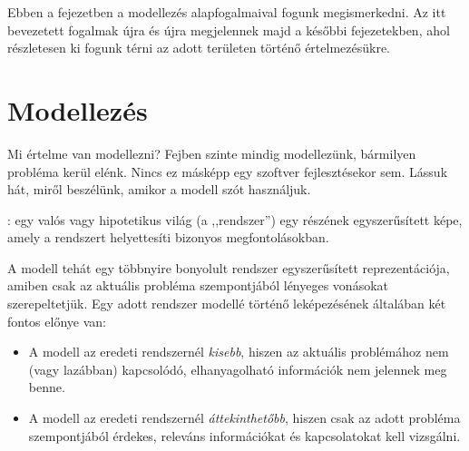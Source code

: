 
Ebben a fejezetben a modellezés alapfogalmaival fogunk megismerkedni. Az itt bevezetett fogalmak újra és újra megjelennek majd a későbbi fejezetekben, ahol részletesen ki fogunk térni az adott területen történő értelmezésükre.


\section{Modellezés}

Mi értelme van modellezni? Fejben szinte mindig modellezünk, bármilyen probléma kerül elénk. Nincs ez másképp egy szoftver fejlesztésekor sem. Lássuk hát, miről beszélünk, amikor a modell szót használjuk.

\begin{definicio}
	: egy valós vagy hipotetikus világ (a ,,rendszer'') egy részének egyszerűsített képe, amely a rendszert helyettesíti bizonyos megfontolásokban.
\end{definicio}

A modell tehát egy többnyire bonyolult rendszer egyszerűsített reprezentációja, amiben csak az aktuális probléma szempontjából lényeges vonásokat szerepeltetjük.
Egy adott rendszer modellé történő leképezésének általában két fontos előnye van: %

\begin{itemize}
	\item A modell az eredeti rendszernél \emph{kisebb}, hiszen az aktuális problémához nem (vagy lazábban) kapcsolódó, elhanyagolható információk nem jelennek meg benne.
	\item A modell az eredeti rendszernél \emph{áttekinthetőbb}, hiszen csak az adott probléma szempontjából érdekes, releváns információkat és kapcsolatokat kell vizsgálni.
\end{itemize}


